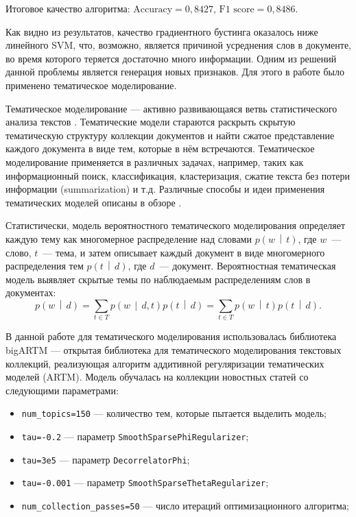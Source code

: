 \documentclass[a4paper, 14pt]{extarticle}
\begin{document}
Итоговое качество алгоритма: $\text{Accuracy} = 0,8427$, $\text{F1 score} = 0,8486$.

Как видно из результатов, качество градиентного бустинга оказалось ниже линейного SVM, что, возможно, является причиной усреднения слов в документе,
во время которого теряется достаточно много информации. Одним из решений данной проблемы является генерация новых признаков. Для этого 
в работе было применено тематическое моделирование.

Тематическое моделирование --- активно развивающаяся ветвь статистического анализа текстов \cite{Blei:2012:PTM:2133806.2133826}. Тематические
модели стараются раскрыть скрытую тематическую структуру коллекции документов и найти сжатое представление каждого документа в виде
тем, которые в нём встречаются. Тематическое моделирование применяется в различных задачах, например, таких как информационный поиск,
классификация, кластеризация, сжатие текста без потери информации (summarization) и т.д. Различные способы и идеи применения тематических моделей
описаны в обзоре \cite{Daud2010}.

Статистически, модель вероятностного тематического моделирования определяет каждую тему как многомерное распределение над словами
$p\left(w \,\middle|\, t\right)$, где $w$~--- слово, $t$~--- тема, и затем описывает каждый документ в виде многомерного распределения тем $p\left(t \,\middle|\, d\right)$, где $d$~--- документ. Вероятностная тематическая модель выявляет скрытые темы по наблюдаемым распределениям слов в документах:
$$
p\left(w \,\middle|\, d\right) = \sum_{t \in T} p\left(w \,\middle|\, d, t\right) p\left(t \,\middle|\, d\right) = \sum_{t \in T} p\left(w \,\middle|\, t\right) p\left(t \,\middle|\, d\right).
$$

В данной работе для тематического моделирования использовалась библиотека bigARTM \cite{bigartm} --- открытая библиотека для тематического 
моделирования текстовых коллекций, реализующая алгоритм аддитивной регуляризации тематических моделей (ARTM). Модель обучалась на коллекции
новостных статей со следующими параметрами:
\begin{itemize}
	\item \verb|num_topics=150| --- количество тем, которые пытается выделить модель;
	\item \verb|tau=-0.2| --- параметр \verb|SmoothSparsePhiRegularizer|;
	\item \verb|tau=3e5| --- параметр \verb|DecorrelatorPhi|;
	\item \verb|tau=-0.001| --- параметр \verb|SmoothSparseThetaRegularizer|;
	\item \verb|num_collection_passes=50| --- число итераций оптимизационного алгоритма;
\end{itemize}
\end{document}
